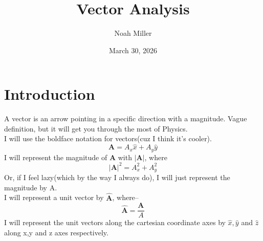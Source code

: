 \documentclass[12pt]{article}
\title{Vector Analysis}
\author{Noah Miller}
\date{March 30, 2026}
\begin{document}
\maketitle

\section{Introduction}
A vector is an arrow pointing in a specific direction with a magnitude. Vague definition, but it will get you through the most of Physics. \\
I will use the boldface notation for vectors(cuz I think it's cooler).
\begin{equation}
    \mathbf{A}=A_x \hat{x} + A_y \hat{y}
\end{equation}
I will represent the magnitude of $\mathbf{A}$ with $|\mathbf{A}|$, where
\begin{equation}
    |\mathbf{A}|^2=A_x^2+A_y^2
\end{equation}
Or, if I feel lazy(which by the way I always do), I will just represent the magnitude by A. 
\\ I will represent a unit vector by $\hat{\mathbf{A}}$, where--
\begin{equation}
    \hat{\mathbf{A}}=\frac{\mathbf{A}}{A}
\end{equation}
I will represent the unit vectors along the cartesian coordinate axes by $\hat{x},\hat{y}$ and $\hat{z}$ along x,y and z axes respectively.
\end{document}
